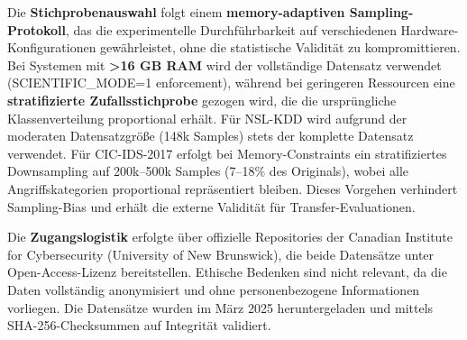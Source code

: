 \documentclass[11pt,a4paper]{article}
\begin{document}
    Die \textbf{Stichprobenauswahl} folgt einem \textbf{memory-adaptiven Sampling-Protokoll}, das die experimentelle Durchführbarkeit auf verschiedenen Hardware-Konfigurationen gewährleistet, ohne die statistische Validität zu kompromittieren. Bei Systemen mit \textbf{>16 GB RAM} wird der vollständige Datensatz verwendet (SCIENTIFIC\_MODE=1 enforcement), während bei geringeren Ressourcen eine \textbf{stratifizierte Zufallsstichprobe} gezogen wird, die die ursprüngliche Klassenverteilung proportional erhält. Für NSL-KDD wird aufgrund der moderaten Datensatzgröße (148k Samples) stets der komplette Datensatz verwendet. Für CIC-IDS-2017 erfolgt bei Memory-Constraints ein stratifiziertes Downsampling auf 200k–500k Samples (7–18\% des Originals), wobei alle Angriffskategorien proportional repräsentiert bleiben. Dieses Vorgehen verhindert Sampling-Bias und erhält die externe Validität für Transfer-Evaluationen.

    Die \textbf{Zugangslogistik} erfolgte über offizielle Repositories der Canadian Institute for Cybersecurity (University of New Brunswick), die beide Datensätze unter Open-Access-Lizenz bereitstellen. Ethische Bedenken sind nicht relevant, da die Daten vollständig anonymisiert und ohne personenbezogene Informationen vorliegen. Die Datensätze wurden im März 2025 heruntergeladen und mittels SHA-256-Checksummen auf Integrität validiert.
\end{document}
